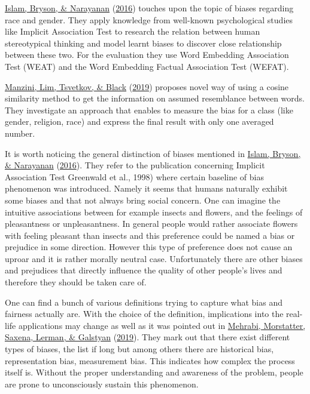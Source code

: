 \documentclass[
]{book}
\begin{document}
\protect\hyperlink{ref-Caliskan2017Semantics}{Islam, Bryson, \& Narayanan} (\protect\hyperlink{ref-Caliskan2017Semantics}{2016}) touches upon the topic of biases regarding race and gender. They apply knowledge from well-known psychological studies like Implicit Association Test to research the relation between human stereotypical thinking and model learnt biases to
discover close relationship between these two. For the evaluation they use Word Embedding Association Test (WEAT) and the Word Embedding Factual Association Test (WEFAT).

\protect\hyperlink{ref-manzini2019black}{Manzini, Lim, Tsvetkov, \& Black} (\protect\hyperlink{ref-manzini2019black}{2019}) proposes novel way of using a cosine similarity method to get the information on assumed resemblance between words. They investigate
an approach that enables to measure the bias for a class (like gender, religion, race) and express the final result with only one averaged number.

It is worth noticing the general distinction of biases mentioned in \protect\hyperlink{ref-Caliskan2017Semantics}{Islam, Bryson, \& Narayanan} (\protect\hyperlink{ref-Caliskan2017Semantics}{2016}). They refer to the publication concerning Implicit Association
Test Greenwald et al., 1998) where certain baseline of bias phenomenon was introduced. Namely it seems that humans naturally exhibit some biases and
that not always bring social concern. One can imagine the intuitive associations between for example insects and flowers, and the feelings of pleasantness or unpleasantness. In general people would rather associate flowers with feeling pleasant than insects and this preference could be named a bias or
prejudice in some direction. However this type of preference does not cause an uproar and it is rather morally neutral case. Unfortunately there are other
biases and prejudices that directly influence the quality of other people's lives and therefore they should be taken care of.

One can find a bunch of various definitions trying to capture what bias and fairness actually are. With the choice of the definition, implications into the real-life applications may change as well as it was pointed out in \protect\hyperlink{ref-Mehrabi2019Survey}{Mehrabi, Morstatter, Saxena, Lerman, \& Galstyan} (\protect\hyperlink{ref-Mehrabi2019Survey}{2019}). They mark out that there exist different types of biases, the list if long but among others there are historical bias, representation bias, measurement bias. This indicates how complex the process itself is. Without the proper understanding and awareness of the problem, people are prone to unconsciously sustain this phenomenon.
\end{document}
